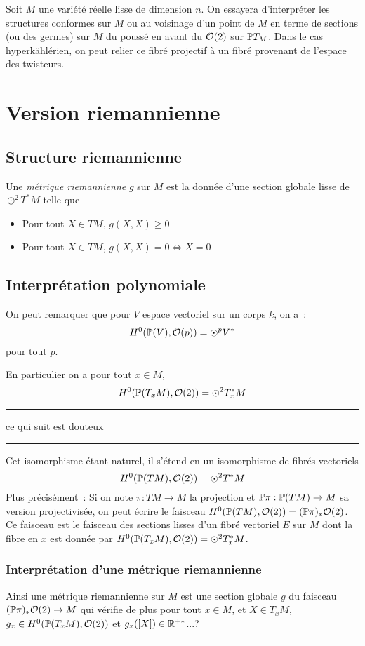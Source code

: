 \documentclass[12pt,makeidx]{amsart}
\newenvironment{douteux}{%
  \color{Grey}\tiny
  \vspace{.3em}
  \hrule
  \begin{center}{\small ce qui suit est douteux}\end{center}
  \hrule
  \vspace{.4em}
}{%
\vspace{.4em}
\hrule
  \vspace{.3em}
}
\begin{document}
Soit $M$ une variété réelle lisse de dimension $n$. On essayera d'interpréter les structures conformes sur $M$ ou au voisinage d'un point de $M$ en terme de sections (ou des germes) sur $M$ du poussé en avant du $\mathcal{O}(2)$ sur $\mathbb{P} T_M$.
Dans le cas hyperkählérien, on peut relier ce fibré projectif à un fibré provenant de l'espace des twisteurs.
\section{Version riemannienne}
\subsection{Structure riemannienne} Une \textit{métrique riemannienne} $g$ sur $M$ est la donnée d'une section globale lisse de $\odot^2 T^*M$ telle que
\begin{itemize}
\item Pour tout $X \in TM$, $g(X,X)\geq 0$
\item Pour tout $X \in TM$, $g(X,X) = 0 \Leftrightarrow X=0$
\end{itemize}

\subsection{Interprétation polynomiale}
On peut remarquer que pour $V$ espace vectoriel sur un corps $k$, on a~:
\begin{equation}\label{Bott}
H^0(\mathbb{P}(V),\mathcal{O}(p)) = \odot^p V^*
\end{equation}
pour tout $p$.

En particulier on a pour tout $x \in M$,
\begin{equation}\label{sym2enx}
H^0(\mathbb{P}(T_xM), \mathcal{O}(2)) = \odot^2T^*_xM
\end{equation}

\begin{douteux}
Cet isomorphisme étant naturel, il s'étend en un isomorphisme de fibrés vectoriels
\begin{equation}
H^0(\mathbb{P}(TM), \mathcal{O}(2)) = \odot^2T^*M
\end{equation}
Plus précisément~: Si on note $\pi : TM \rightarrow M$ la projection et $\mathbb{P}\pi : \mathbb{P}(TM) \rightarrow M$ sa version projectivisée, on peut écrire le faisceau $H^0(\mathbb{P}(TM),\mathcal{O}(2)) = (\mathbb{P}\pi)_*\mathcal{O}(2)$. Ce faisceau est le faisceau des sections lisses d'un fibré vectoriel $E$ sur $M$ dont la fibre en $x$ est donnée par $H^0(\mathbb{P}(T_xM), \mathcal{O}(2)) = \odot^2T^*_xM$.

\subsubsection{Interprétation d'une métrique riemannienne}
Ainsi une métrique riemannienne sur $M$ est une section globale $g$ du faisceau $(\mathbb{P}\pi)_* \mathcal{O}(2) \rightarrow M$ qui vérifie de plus pour tout $x \in M$, et $X \in T_xM$, 
$g_x \in H^0(\mathbb{P}(T_xM),\mathcal{O}(2))$ et $g_x([X]) \in \mathbb{R}^{+*}$...?
\end{douteux}
\end{document}
